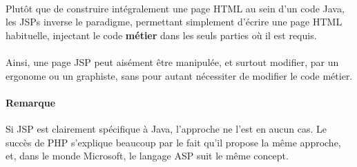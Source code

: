 { \paragraph{} Plutôt que de construire intégralement une page HTML au sein d'un code Java, les JSPs
 inverse le paradigme, permettant simplement d'écrire une page HTML habituelle, injectant le code
 \textbf{métier} dans les seuls parties où il est requis.

 \paragraph{} Ainsi, une page JSP peut aisément être manipulée, et surtout modifier, par un
 ergonome ou un graphiste, sans pour autant nécessiter de modifier le code métier.

 \paragraph{Remarque} Si JSP est clairement spécifique à Java, l'approche ne l'est en aucun cas. Le
 succès de PHP s'explique beaucoup par le fait qu'il propose la même approche, et, dans le monde
 Microsoft, le langage ASP suit le même concept.

}
